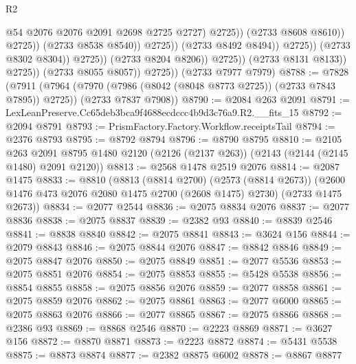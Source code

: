 \begin{lexlean}{R2}
\begin{coremodule}
                                                    @54
                                                    @2076
                                                    @2076
                                                    @2091
                                                    @2698
                                                    @2725
                                                    @2727)
                                                  @2725))
                                              (@2733 @8608 @8610))
                                            @2725))
                                        (@2733 @8538 @8540))
                                      @2725))
                                  (@2733 @8492 @8494))
                                @2725))
                            (@2733 @8302 @8304))
                          @2725))
                      (@2733 @8204 @8206))
                    @2725))
                (@2733 @8131 @8133))
              @2725))
          (@2733 @8055 @8057))
        @2725))
    (@2733 @7977 @7979)
@8788 := @7828
    (@7911
      (@7964 (@7970 (@7986 (@8042 (@8048 @8773 @2725)) (@2733 @7843 @7895)) @2725))
      (@2733 @7837 @7908))
@8790 := @2084 @263 @2091
@8791 := LexLeanPreserve.Cc65deb3bca9f4688ecdccc4b9d3c76a9.R2.__fits_15
@8792 := @2094 @8791
@8793 := PrismFactory.Factory.Workflow.receiptsTail
@8794 := @2376 @8793
@8795 := @8792 @8794
@8796 := @8790 @8795
@8810 := @2105
    @263
    @2091
    @8795
    @1480
    @2120
    (@2126 (@2137 @263))
    (@2143 (@2144 (@2145 @1480) @2091 @2120))
@8813 := @2568 @1478 @2519 @2076
@8814 := @2087 @1475
@8833 := @8810
    (@8813
      (@8814 @2700)
      (@2573 (@8814 @2673))
      (@2600 @1476 @473 @2076 @2080 @1475 @2700 (@2608 @1475) @2730)
      (@2733 @1475 @2673))
@8834 := @2077 @2544
@8836 := @2075 @8834 @2076
@8837 := @2077 @8836
@8838 := @2075 @8837
@8839 := @2382 @93
@8840 := @8839 @2546
@8841 := @8838 @8840
@8842 := @2075 @8841
@8843 := @3624 @156
@8844 := @2079 @8843
@8846 := @2075 @8844 @2076
@8847 := @8842 @8846
@8849 := @2075 @8847 @2076
@8850 := @2075 @8849
@8851 := @2077 @5536
@8853 := @2075 @8851 @2076
@8854 := @2075 @8853
@8855 := @5428 @5538
@8856 := @8854 @8855
@8858 := @2075 @8856 @2076
@8859 := @2077 @8858
@8861 := @2075 @8859 @2076
@8862 := @2075 @8861
@8863 := @2077 @6000
@8865 := @2075 @8863 @2076
@8866 := @2077 @8865
@8867 := @2075 @8866
@8868 := @2386 @93
@8869 := @8868 @2546
@8870 := @2223 @8869
@8871 := @3627 @156
@8872 := @8870 @8871
@8873 := @2223 @8872
@8874 := @5431 @5538
@8875 := @8873 @8874
@8877 := @2382 @8875 @6002
@8878 := @8867 @8877

\end{coremodule}
\end{lexlean}
